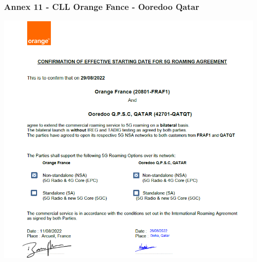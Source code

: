 \subsubsection*{Annex 11 - CLL Orange Fance - Ooredoo Qatar}
\begin{center}
\includegraphics[scale=1.1]{annexs/CLL OOREDOO Quatar.PNG}
\end{center}
